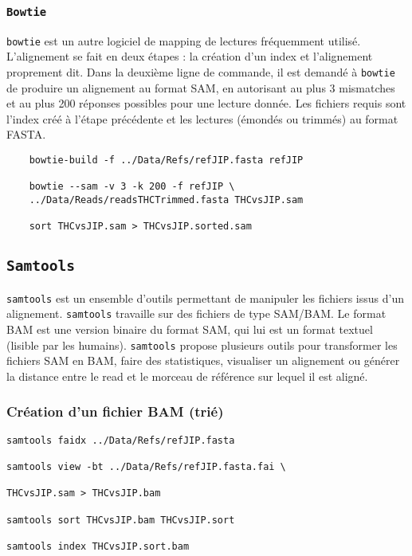 \documentclass[a4paper,12pt]{article}
\begin{document}
\subsubsection{\tt{Bowtie}}
{\tt bowtie} est un autre logiciel de mapping de lectures fréquemment utilisé. L'alignement se fait en deux étapes : la création d'un index et l'alignement proprement dit. Dans la deuxième ligne de commande, il est demandé à {\tt bowtie} de produire un alignement au format SAM, en autorisant au plus 3 mismatches et au plus 200 réponses possibles pour une lecture donnée. Les fichiers requis sont l'index créé à l'étape précédente et les lectures (émondés ou trimmés) au format FASTA.

\begin{lstlisting}
	bowtie-build -f ../Data/Refs/refJIP.fasta refJIP

	bowtie --sam -v 3 -k 200 -f refJIP \
	../Data/Reads/readsTHCTrimmed.fasta THCvsJIP.sam
	
	sort THCvsJIP.sam > THCvsJIP.sorted.sam
\end{lstlisting}

\subsection{{\tt Samtools}}

{\tt samtools} est un ensemble d'outils permettant de manipuler les fichiers issus d'un alignement. {\tt samtools} travaille sur des fichiers de type SAM/BAM. Le format BAM est une version binaire du format SAM, qui lui est un format textuel (lisible par les humains). {\tt samtools} propose plusieurs outils pour transformer les fichiers SAM en BAM, faire des statistiques, visualiser un alignement ou générer la distance entre le read et le morceau de référence sur lequel il est aligné.

\subsubsection*{Création d'un fichier BAM (trié)}
\begin{lstlisting}
samtools faidx ../Data/Refs/refJIP.fasta

samtools view -bt ../Data/Refs/refJIP.fasta.fai \

THCvsJIP.sam > THCvsJIP.bam

samtools sort THCvsJIP.bam THCvsJIP.sort

samtools index THCvsJIP.sort.bam
\end{lstlisting}
\end{document}
